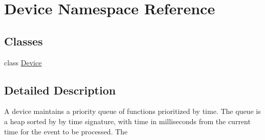 \hypertarget{namespace_device}{}\section{Device Namespace Reference}
\label{namespace_device}
\subsection*{Classes}
\begin{DoxyCompactItemize}
\item 
class \hyperlink{class_device_1_1_device}{Device}
\end{DoxyCompactItemize}


\subsection{Detailed Description}
\begin{DoxyVerb}A device maintains a priority queue of functions prioritized by time.
The queue is a heap sorted by by time signature, with time in milliseconds from the current time for the event to be processed.
The\end{DoxyVerb}
 